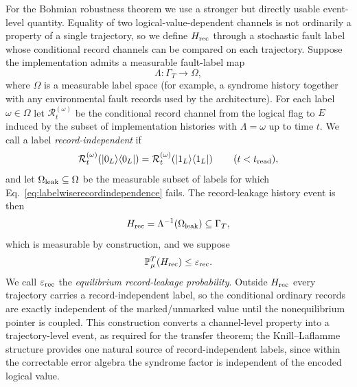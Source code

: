 \documentclass[pdflatex,sn-mathphys-num]{sn-jnl}
\theoremstyle{thmstyleone}
\begin{document}
For the Bohmian robustness theorem we use a stronger but directly usable event-level quantity. Equality of two logical-value-dependent channels is not ordinarily a property of a single trajectory, so we define $H_{\rm rec}$ through a stochastic fault label whose conditional record channels can be compared on each trajectory. Suppose the implementation admits a measurable fault-label map
\begin{equation}
\Lambda:\Gamma_T\longrightarrow\Omega,
\label{eq:faultlabel}
\end{equation}
where $\Omega$ is a measurable label space (for example, a syndrome history together with any environmental fault records used by the architecture). For each label $\omega\in\Omega$ let $\mathcal R_t^{(\omega)}$ be the conditional record channel from the logical flag to $E$ induced by the subset of implementation histories with $\Lambda=\omega$ up to time $t$. We call a label \emph{record-independent} if
\begin{equation}
\mathcal R_t^{(\omega)}\!\left(|0_L\rangle\langle0_L|\right)
=
\mathcal R_t^{(\omega)}\!\left(|1_L\rangle\langle1_L|\right)
\qquad (t<t_{\rm read}),
\label{eq:labelwiserecordindependence}
\end{equation}
and let $\Omega_{\rm leak}\subseteq\Omega$ be the measurable subset of labels for which Eq.~\eqref{eq:labelwiserecordindependence} fails. The record-leakage history event is then
\begin{equation}
H_{\rm rec}=\Lambda^{-1}(\Omega_{\rm leak})
\subseteq\Gamma_T,
\label{eq:Hrecdef}
\end{equation}
which is measurable by construction, and we suppose
\begin{equation}
\mathbb P_\mu^T(H_{\rm rec})\le\varepsilon_{\rm rec}.
\label{eq:recordeventbound}
\end{equation}
We call $\varepsilon_{\rm rec}$ the \emph{equilibrium record-leakage probability}. Outside $H_{\rm rec}$ every trajectory carries a record-independent label, so the conditional ordinary records are exactly independent of the marked/unmarked value until the nonequilibrium pointer is coupled. This construction converts a channel-level property into a trajectory-level event, as required for the transfer theorem; the Knill--Laflamme structure provides one natural source of record-independent labels, since within the correctable error algebra the syndrome factor is independent of the encoded logical value.
\end{document}
